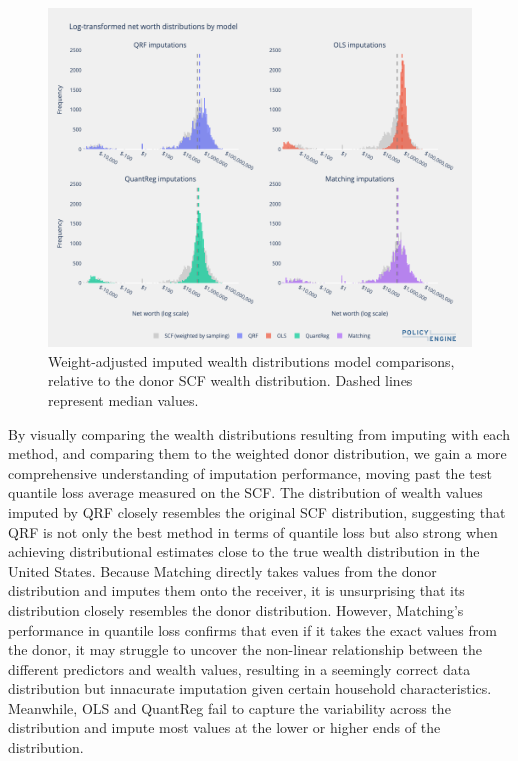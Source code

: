 \begin{figure}[h]
    \centering
    \includegraphics[width=\textwidth]{figures/imputation_distributions_method_comparison.png}
    \caption{Weight-adjusted imputed wealth distributions model comparisons, relative to the donor SCF wealth distribution. Dashed lines represent median values.}
    \label{fig:imputation_distributions_method_comparison}
\end{figure}

By visually comparing the wealth distributions resulting from imputing with each method, and comparing them to the weighted donor distribution, we gain a more comprehensive understanding of imputation performance, moving past the test quantile loss average measured on the SCF. The distribution of wealth values imputed by QRF closely resembles the original SCF distribution, suggesting that QRF is not only the best method in terms of quantile loss but also strong when achieving distributional estimates close to the true wealth distribution in the United States. Because Matching directly takes values from the donor distribution and imputes them onto the receiver, it is unsurprising that its distribution closely resembles the donor distribution. However, Matching's performance in quantile loss confirms that even if it takes the exact values from the donor, it may struggle to uncover the non-linear relationship between the different predictors and wealth values, resulting in a seemingly correct data distribution but innacurate imputation given certain household characteristics. Meanwhile, OLS and QuantReg fail to capture the variability across the distribution and impute most values at the lower or higher ends of the distribution. 

